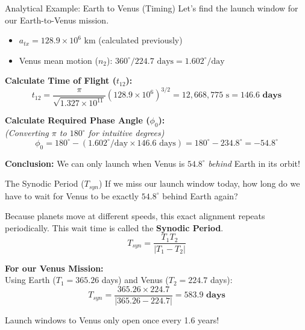 \documentclass[11pt]{beamer}
\begin{document}
\begin{frame}{Analytical Example: Earth to Venus (Timing)}
    Let's find the launch window for our Earth-to-Venus mission. 
    \begin{itemize}
        \item $a_{tx} = 128.9 \times 10^6$ km (calculated previously)
        \item Venus mean motion ($n_2$): $360^\circ / 224.7 \text{ days} = 1.602^\circ/\text{day}$
    \end{itemize}
    
    \vspace{0.2cm}
    \textbf{Calculate Time of Flight ($t_{12}$):}
    \begin{equation*}
        t_{12} = \frac{\pi}{\sqrt{1.327 \times 10^{11}}} (128.9 \times 10^6)^{3/2} = 12,668,775 \text{ s} = \mathbf{146.6 \text{ days}}
    \end{equation*}
    
    \vspace{0.2cm}
    \textbf{Calculate Required Phase Angle ($\phi_0$):} \\
    \textit{(Converting $\pi$ to $180^\circ$ for intuitive degrees)}
    \begin{equation*}
        \phi_0 = 180^\circ - (1.602^\circ/\text{day} \times 146.6 \text{ days}) = 180^\circ - 234.8^\circ = \mathbf{-54.8^\circ}
    \end{equation*}
    
    \textbf{Conclusion:} We can only launch when Venus is $54.8^\circ$ \textit{behind} Earth in its orbit!
\end{frame}

\begin{frame}{The Synodic Period ($T_{syn}$)}
    If we miss our launch window today, how long do we have to wait for Venus to be exactly $54.8^\circ$ behind Earth again? 
    
    \vspace{0.3cm}
    Because planets move at different speeds, this exact alignment repeats periodically. This wait time is called the \textbf{Synodic Period}.
    \begin{equation}
        T_{syn} = \frac{T_1 T_2}{|T_1 - T_2|}
    \end{equation}
    
    \textbf{For our Venus Mission:} \\
    Using Earth ($T_1 = 365.26$ days) and Venus ($T_2 = 224.7$ days):
    \begin{equation*}
        T_{syn} = \frac{365.26 \times 224.7}{|365.26 - 224.7|} = \mathbf{583.9 \text{ days}}
    \end{equation*}
    
    Launch windows to Venus only open once every 1.6 years!
\end{frame}
\end{document}
